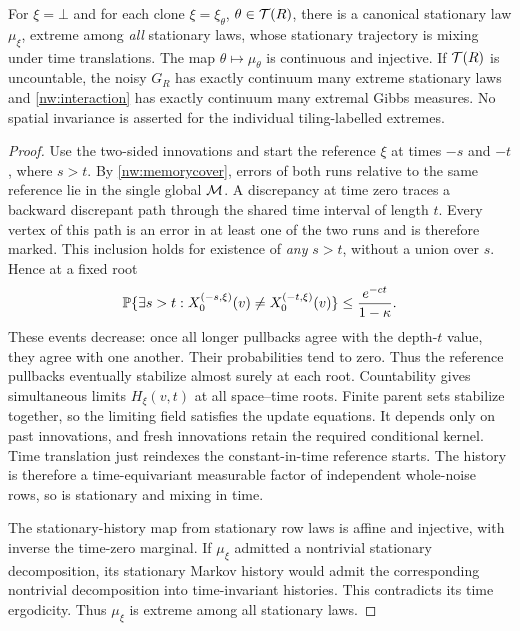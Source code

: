 \begin{theorem}\label{nw:continuum}
For $\xi=\bot$ and for each clone $\xi=\xi_\theta$, $\theta\in\mathcal T(R)$, there is a canonical stationary law $\mu_\xi$, extreme among \emph{all} stationary laws, whose stationary trajectory is mixing under time translations. The map $\theta\mapsto\mu_\theta$ is continuous and injective. If $\mathcal T(R)$ is uncountable, the noisy $G_R$ has exactly continuum many extreme stationary laws and \eqref{nw:interaction} has exactly continuum many extremal Gibbs measures. No spatial invariance is asserted for the individual tiling-labelled extremes.
\end{theorem}
\begin{proof}
Use the two-sided innovations and start the reference $\xi$ at times $-s$ and $-t$, where $s>t$. By \cref{nw:memorycover}, errors of both runs relative to the same reference lie in the single global $\mathcal M$. A discrepancy at time zero traces a backward discrepant path through the shared time interval of length $t$. Every vertex of this path is an error in at least one of the two runs and is therefore marked. This inclusion holds for existence of \emph{any} $s>t$, without a union over $s$. Hence at a fixed root
\begin{equation}\label{nw:reference-tail}
 \mathbb{P}\{\exists s>t:
 X_0^{(-s,\xi)}(v)\ne X_0^{(-t,\xi)}(v)\}
 \le\frac{e^{-ct}}{1-\kappa}.
\end{equation}
These events decrease: once all longer pullbacks agree with the depth-$t$ value, they agree with one another. Their probabilities tend to zero. Thus the reference pullbacks eventually stabilize almost surely at each root. Countability gives simultaneous limits $H_\xi(v,t)$ at all space--time roots. Finite parent sets stabilize together, so the limiting field satisfies the update equations. It depends only on past innovations, and fresh innovations retain the required conditional kernel. Time translation just reindexes the constant-in-time reference starts. The history is therefore a time-equivariant measurable factor of independent whole-noise rows, so is stationary and mixing in time.

The stationary-history map from stationary row laws is affine and injective, with inverse the time-zero marginal. If $\mu_\xi$ admitted a nontrivial stationary decomposition, its stationary Markov history would admit the corresponding nontrivial decomposition into time-invariant histories. This contradicts its time ergodicity. Thus $\mu_\xi$ is extreme among all stationary laws.


\end{proof}
